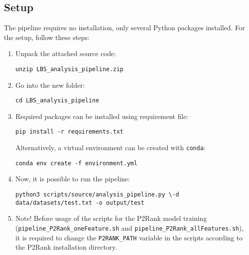 \documentclass[12pt,a4paper]{report}
\begin{document}
\subsection{Setup}
The pipeline requires no installation, only several Python packages installed. For the setup, follow these steps:
\begin{enumerate}
\item Unpack the attached source code:

\texttt{unzip LBS\_analysis\_pipeline.zip}

\item Go into the new folder:

\texttt{cd LBS\_analysis\_pipeline}

\item Required packages can be installed using requirement file:

\texttt{pip install -r requirements.txt}

Alternatively, a virtual environment can be created with \texttt{conda}:

\texttt{conda env create -f environment.yml}

\item Now, it is possible to run the pipeline:

\texttt{python3 scripts/source/analysis\_pipeline.py \textbackslash \newline -d data/datasets/test.txt -o output/test}

\item Note! Before usage of the scripts for the P2Rank model training \newline (\texttt{pipeline\_P2Rank\_oneFeature.sh} and \texttt{pipeline\_P2Rank\_allFeatures.sh}), it is required to change the \texttt{P2RANK\_PATH} variable in the scripts according to the P2Rank installation directory.

\end{enumerate}
\end{document}
